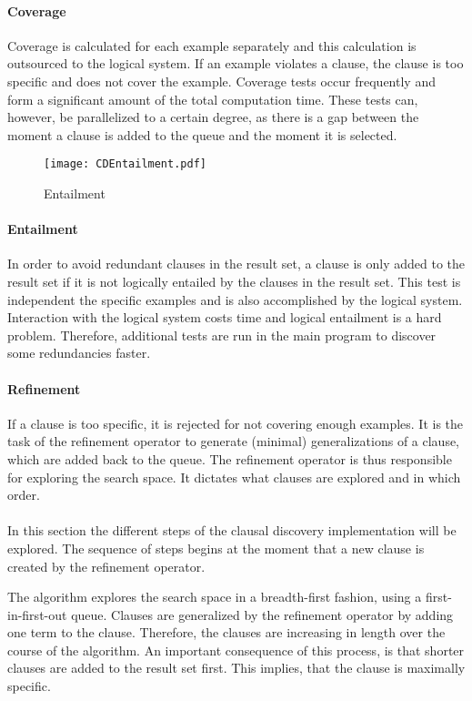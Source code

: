 \paragraph{Coverage} 
Coverage is calculated for each example separately and this calculation is outsourced to the logical system.
If an example violates a clause, the clause is too specific and does not cover the example.
Coverage tests occur frequently and form a significant amount of the total computation time.
These tests can, however, be parallelized to a certain degree, as there is a gap between the moment a clause is added to the queue and the moment it is selected.

\begin{figure}[!htp]

	\caption{Entailment}
	\centering
		\texttt{[image: CDEntailment.pdf]}
	\label{fig:cd_coverage}

\end{figure}


\paragraph{Entailment}
In order to avoid redundant clauses in the result set, a clause is only added to the result set if it is not logically entailed by the clauses in the result set.
This test is independent the specific examples and is also accomplished by the logical system.
Interaction with the logical system costs time and logical entailment is a hard problem.
Therefore, additional tests are run in the main program to discover some redundancies faster.

\paragraph{Refinement}
If a clause is too specific, it is rejected for not covering enough examples.
It is the task of the refinement operator to generate (minimal) generalizations of a clause, which are added back to the queue.
The refinement operator is thus responsible for exploring the search space.
It dictates what clauses are explored and in which order.
\\\\
In this section the different steps of the clausal discovery implementation will be explored.
The sequence of steps begins at the moment that a new clause is created by the refinement operator.

The algorithm explores the search space in a breadth-first fashion, using a first-in-first-out queue.
Clauses are generalized by the refinement operator by adding one term to the clause.
Therefore, the clauses are increasing in length over the course of the algorithm.
An important consequence of this process, is that shorter clauses are added to the result set first.
This implies, that the clause is maximally specific.

